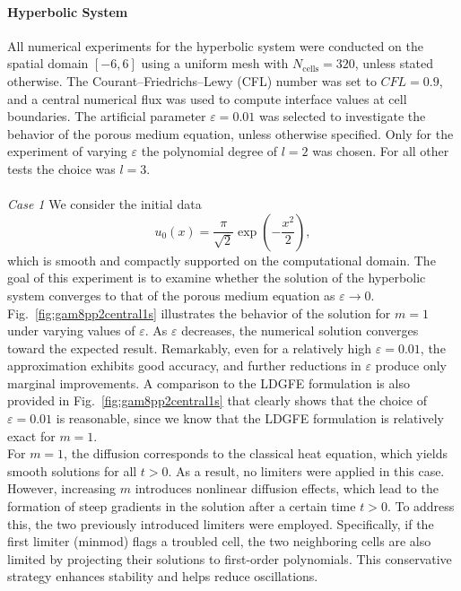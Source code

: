 \documentclass[a4paper,12pt]{paper}
\begin{document}
\paragraph{Hyperbolic System}
All numerical experiments for the hyperbolic system were conducted on the spatial domain \( [-6, 6] \) using a uniform mesh with \( N_{\text{cells}} = 320 \), unless stated otherwise. The Courant–Friedrichs–Lewy (CFL) number was set to \( \textit{CFL} = 0.9 \), and a central numerical flux was used to compute interface values at cell boundaries. The artificial parameter \( \varepsilon = 0.01 \) was selected to investigate the behavior of the porous medium equation, unless otherwise specified. Only for the experiment of varying $\varepsilon$ the polynomial degree of $l=2$ was chosen. For all other tests the choice was $l=3$.\\
\\
\textit{Case 1} We consider the initial data
\[
u_0(x) = \frac{\pi}{\sqrt{2}} \exp\left(-\frac{x^2}{2}\right),
\label{eq: smoothInitialExp}
\]
which is smooth and compactly supported on the computational domain. The goal of this experiment is to examine whether the solution of the hyperbolic system converges to that of the porous medium equation as \( \varepsilon \to 0 \).
Fig.~\ref{fig:gam8pp2central1s} illustrates the behavior of the solution for \( m = 1 \) under varying values of \( \varepsilon \). As \( \varepsilon \) decreases, the numerical solution converges toward the expected result. Remarkably, even for a relatively high \( \varepsilon = 0.01 \), the approximation exhibits good accuracy, and further reductions in \( \varepsilon \) produce only marginal improvements. A comparison to the LDGFE formulation is also provided in Fig.~\ref{fig:gam8pp2central1s} that clearly shows that the choice of $\varepsilon=0.01$ is reasonable, since we know that the LDGFE formulation is relatively exact for $m=1$.\\
For \( m = 1 \), the diffusion corresponds to the classical heat equation, which yields smooth solutions for all \( t > 0 \). As a result, no limiters were applied in this case. However, increasing \( m \) introduces nonlinear diffusion effects, which lead to the formation of steep gradients in the solution after a certain time \( t > 0 \). To address this, the two previously introduced limiters were employed. Specifically, if the first limiter (minmod) flags a troubled cell, the two neighboring cells are also limited by projecting their solutions to first-order polynomials. This conservative strategy enhances stability and helps reduce oscillations.
\end{document}
